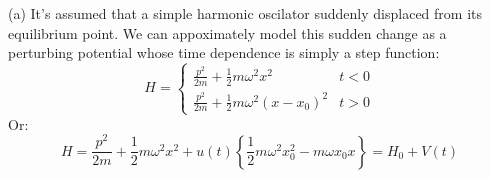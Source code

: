 \begin{homeworkProblem}
\begin{homeworkSection}{(a)}
It's assumed that a simple harmonic oscilator suddenly displaced from its equilibrium point. We can appoximately model this sudden change as a perturbing potential whose time dependence is simply a step function:
\begin{equation}
H=\left\{
\begin{array}{ll}
\frac{p^2}{2m}+\frac{1}{2}m\omega^2 x^2 & t<0\\
\frac{p^2}{2m}+\frac{1}{2}m\omega^2(x-x_0)^2 & t>0
\end{array}
\right.
\end{equation}
Or:
\begin{equation}\label{P3-H}
H=\frac{p^2}{2m}+\frac{1}{2}m\omega^2 x^2 +u(t)\left\{\frac{1}{2}m\omega^2 x_0^2-m\omega x_0x\right\}=H_0+V(t)
\end{equation}


\end{homeworkSection}
\end{homeworkProblem}
